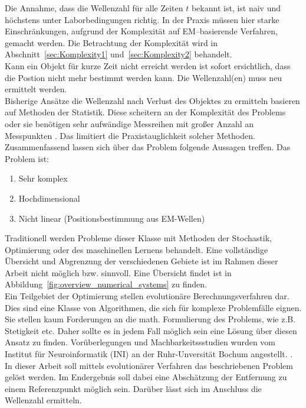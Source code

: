 Die Annahme, dass die Wellenzahl für alle Zeiten $t$ bekannt ist, ist naiv und höchstens unter Laborbedingungen richtig. In der Praxis müssen hier starke Einschränkungen, aufgrund der Komplexität auf EM--basierende Verfahren, gemacht werden. Die Betrachtung der Komplexität wird in Abschnitt~\ref{sec:Komplexity1} und~\ref{sec:Komplexity2} behandelt.\\
Kann ein Objekt für kurze Zeit nicht erreicht werden ist sofort ersichtlich, dass die Postion nicht mehr bestimmt werden kann. Die Wellenzahl(en) muss neu ermittelt werden.\\ 
%

Bisherige Ansätze die Wellenzahl nach Verlust des Objektes zu ermitteln basieren auf Methoden der Statistik. Diese scheitern an der Komplexität des Problems oder sie benötigen sehr aufwändige Messreihen mit großer Anzahl an Messpunkten \cite{amedo1}. Das limitiert die Praxistauglichkeit solcher Methoden.\\
%

Zusammenfassend lassen sich über das Problem folgende Aussagen treffen. Das Problem ist: 
%
\begin{enumerate}
	\item Sehr komplex
	\item Hochdimensional
	\item Nicht linear (Positionsbestimmung aus EM-Wellen)
\end{enumerate}
%

Traditionell werden Probleme dieser Klasse mit Methoden der Stochastik, Optimierung oder des maschinellen Lernens behandelt. Eine vollständige Übersicht und Abgrenzung der verschiedenen Gebiete ist im Rahmen dieser Arbeit nicht möglich bzw. sinnvoll. Eine Übersicht findet ist in Abbildung~\ref{fig:overview_numerical_systems} zu finden.\\
%

Ein Teilgebiet der Optimierung stellen evolutionäre Berechnungsverfahren dar. Dies sind eine Klasse von Algorithmen, die sich für komplexe Problemfälle eignen. Sie stellen kaum Forderungen an die math. Formulierung des Problems, wie z.B. Stetigkeit etc. Daher sollte es in jedem Fall möglich sein eine Lösung über diesen Ansatz zu finden. Vorüberlegungen und Machbarkeitssstudien wurden vom Institut für Neuroinformatik (INI) an der Ruhr-Unversität Bochum angestellt. \cite{Wil1,Muz1}.\\
%

In dieser Arbeit soll mittels evolutionärer Verfahren das beschriebenen Problem gelöst werden. Im Endergebnis soll dabei eine Abschätzung der Entfernung zu einem Referenzpunkt möglich sein. Darüber lässt sich im Anschluss die Wellenzahl ermitteln.
